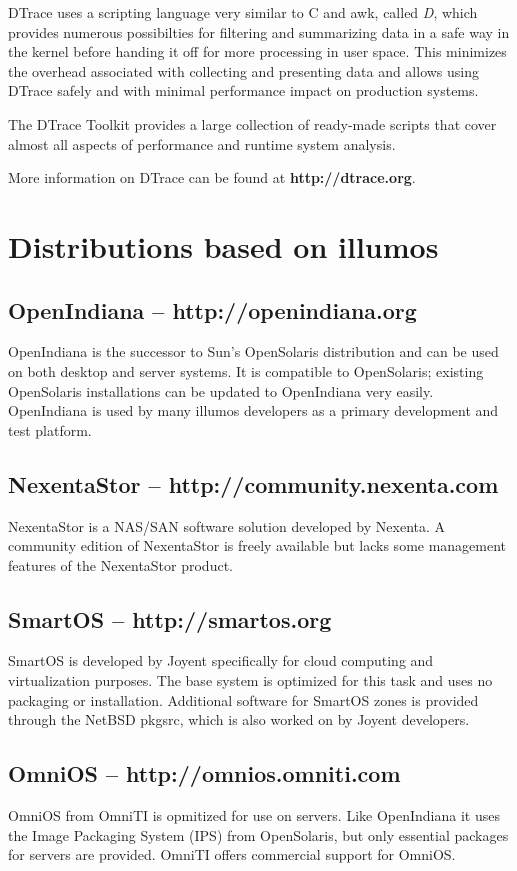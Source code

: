 \documentclass[11pt,foldmark,notumble]{leaflet}
\begin{document}
DTrace uses a scripting language very similar to C and awk, called
\emph{D}, which provides numerous possibilties for filtering and
summarizing data in a safe way in the kernel before handing it off for
more processing in user space. This minimizes the overhead associated
with collecting and presenting data and allows using DTrace
safely and with minimal performance impact on production systems.

The DTrace Toolkit provides a large collection of ready-made scripts
that cover almost all aspects of performance and runtime system
analysis.

More information on DTrace can be found at \textbf{http://dtrace.org}.

\section{Distributions based on illumos}
\subsection{OpenIndiana -- http://openindiana.org}
OpenIndiana is the successor to Sun's OpenSolaris distribution and can
be used on both desktop and server systems. It is compatible to
OpenSolaris; existing OpenSolaris installations can be updated to
OpenIndiana very easily. OpenIndiana is used by many illumos
developers as a primary development and test platform.

\subsection{NexentaStor -- http://community.nexenta.com}
NexentaStor is a NAS/SAN software solution developed by Nexenta. A
community edition of NexentaStor is freely available but lacks some
management features of the NexentaStor product.

\subsection{SmartOS -- http://smartos.org}
SmartOS is developed by Joyent specifically for cloud computing and
virtualization purposes. The base system is optimized for this task
and uses no packaging or installation. Additional software for
SmartOS zones is provided through the NetBSD pkgsrc, which is also
worked on by Joyent developers.

\subsection{OmniOS -- http://omnios.omniti.com}
OmniOS from OmniTI is opmitized for use on servers. Like OpenIndiana
it uses the Image Packaging System (IPS) from OpenSolaris, but only
essential packages for servers are provided. OmniTI offers commercial
support for OmniOS.
\end{document}
